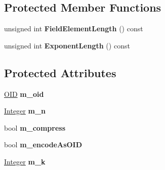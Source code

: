 \subsection*{Protected Member Functions}
\begin{DoxyCompactItemize}
\item 
\hypertarget{class_d_l___group_parameters___e_c_a6932a61f7c95246e4dfcb1ee757d4282}{
unsigned int {\bfseries FieldElementLength} () const }
\label{class_d_l___group_parameters___e_c_a6932a61f7c95246e4dfcb1ee757d4282}

\item 
\hypertarget{class_d_l___group_parameters___e_c_a9a175a3b54681dfc25efe869ab2e422d}{
unsigned int {\bfseries ExponentLength} () const }
\label{class_d_l___group_parameters___e_c_a9a175a3b54681dfc25efe869ab2e422d}

\end{DoxyCompactItemize}
\subsection*{Protected Attributes}
\begin{DoxyCompactItemize}
\item 
\hypertarget{class_d_l___group_parameters___e_c_a566488b1e9819188a22ad1aa528faa6b}{
\hyperlink{class_o_i_d}{OID} {\bfseries m\_\-oid}}
\label{class_d_l___group_parameters___e_c_a566488b1e9819188a22ad1aa528faa6b}

\item 
\hypertarget{class_d_l___group_parameters___e_c_a3cd786ca6b672329ed2ba33088504c65}{
\hyperlink{class_integer}{Integer} {\bfseries m\_\-n}}
\label{class_d_l___group_parameters___e_c_a3cd786ca6b672329ed2ba33088504c65}

\item 
\hypertarget{class_d_l___group_parameters___e_c_ae3f4fecf72d3d268b41cf05e11c14eab}{
bool {\bfseries m\_\-compress}}
\label{class_d_l___group_parameters___e_c_ae3f4fecf72d3d268b41cf05e11c14eab}

\item 
\hypertarget{class_d_l___group_parameters___e_c_a6066c6c2af490c0c13367854dc4751bf}{
bool {\bfseries m\_\-encodeAsOID}}
\label{class_d_l___group_parameters___e_c_a6066c6c2af490c0c13367854dc4751bf}

\item 
\hypertarget{class_d_l___group_parameters___e_c_a10fa06efdc59e48f437807c7445a8b0f}{
\hyperlink{class_integer}{Integer} {\bfseries m\_\-k}}
\label{class_d_l___group_parameters___e_c_a10fa06efdc59e48f437807c7445a8b0f}

\end{DoxyCompactItemize}


